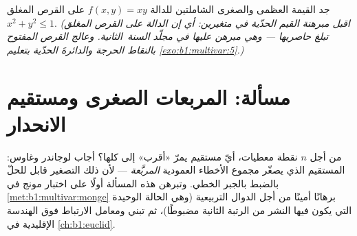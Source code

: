 \begin{exercise}[$\star\star\star$]\label{exo:b1:multivar:12}
جد القيمة العظمى والصغرى الشاملتين للدالة $f(x, y) = xy$ على
القرص المغلق $x^2 + y^2 \leq 1$. \emph{(اقبل مبرهنة القيم
الحدّية في متغيرين: أي إن الدالة  على القرص المغلق
تبلغ حاصريها --- وهي مبرهن عليها في مجلّد السنة~الثانية. وعالج
القرص المفتوح بالنقاط الحرجة والدائرةَ الحدّية
بتعليم \cref{exo:b1:multivar:5}.)}
\end{exercise}

\section{مسألة: المربعات الصغرى ومستقيم الانحدار}

\begin{problem}\label{pb:b1:multivar:1}
من أجل $n$ نقطة معطيات، أيّ مستقيم يمرّ «أقرب» إلى
كلها؟ أجاب لوجاندر وغاوس: المستقيم الذي يصغّر
مجموع الأخطاء العمودية \emph{المربَّعة} --- لأن ذلك
التصغير قابل للحلّ بالضبط بالجبر الخطي. وتبرهن هذه المسألة
أولًا على اختبار مونج في \cref{met:b1:multivar:monge}
برهانًا أمينًا من أجل الدوال التربيعية (وهي الحالة الوحيدة التي يكون
فيها النشر من الرتبة الثانية مضبوطًا)، ثم تبني   ومعامل الارتباط
فوق الهندسة الإقليدية في
\cref{ch:b1:euclid}.


\end{problem}
